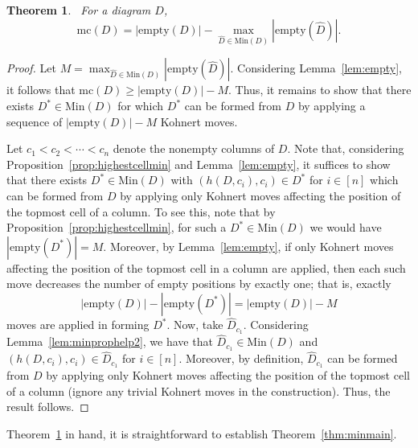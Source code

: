 \documentclass[letterpaper,10pt]{article}
\newtheorem{theorem}{Theorem}[section]
\newtheorem{corollary}[theorem]{Corollary}
\begin{document}
\begin{theorem}~\label{thm:min}
    For a diagram $D$, $$\mathrm{mc}(D)=|\mathrm{empty}(D)|-\max_{\widehat{D}\in\mathrm{Min}(D)}|\mathrm{empty}(\widehat{D})|.$$
\end{theorem}
\begin{proof}
    Let $M=\max_{\widehat{D}\in\mathrm{Min}(D)}|\mathrm{empty}(\widehat{D})|$.
    Considering Lemma~\ref{lem:empty}, it follows that $\mathrm{mc}(D)\ge|\mathrm{empty}(D)|-M$. Thus, it remains to show that there exists $D^*\in \mathrm{Min}(D)$ for which $D^*$ can be formed from $D$ by applying a sequence of $|\mathrm{empty}(D)|-M$ Kohnert moves.

    Let $c_1<c_2<\cdots<c_n$ denote the nonempty columns of $D$. Note that, considering Proposition~\ref{prop:highestcellmin} and Lemma~\ref{lem:empty}, it suffices to show that there exists $D^*\in\mathrm{Min}(D)$ with $(h(D,c_i),c_i)\in D^*$ for $i\in [n]$ which can be formed from $D$ by applying only Kohnert moves affecting the position of the topmost cell of a column. To see this, note that by Proposition~\ref{prop:highestcellmin}, for such a $D^*\in \mathrm{Min}(D)$ we would have $|\mathrm{empty}(D^*)|=M$. Moreover, by Lemma~\ref{lem:empty}, if only Kohnert moves affecting the position of the topmost cell in a column are applied, then each such move decreases the number of empty positions by exactly one; that is, exactly $$|\mathrm{empty}(D)|-|\mathrm{empty}(D^*)|=|\mathrm{empty}(D)|-M$$ moves are applied in forming $D^*$. Now, take $\widehat{D}_{c_1}$. Considering Lemma~\ref{lem:minprophelp2}, we have that $\widehat{D}_{c_1}\in\mathrm{Min}(D)$ and $(h(D,c_i),c_i)\in\widehat{D}_{c_1}$ for $i\in [n]$. Moreover, by definition, $\widehat{D}_{c_1}$ can be formed from $D$ by applying only Kohnert moves affecting the position of the topmost cell of a column (ignore any trivial Kohnert moves in the construction). Thus, the result follows.
\end{proof}


Theorem~\ref{thm:min} in hand, it is straightforward to establish Theorem~\ref{thm:minmain}. 
\end{document}
